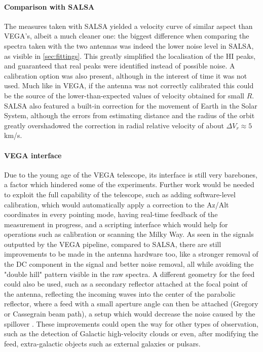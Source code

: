 \paragraph{Comparison with SALSA}
The measures taken with SALSA yielded a velocity curve of similar aspect than VEGA's, albeit a much cleaner one:
the biggest difference when comparing the spectra taken with the two antennas was indeed the lower noise level in SALSA, as visible in \autoref{sec:fittings}. 
This greatly simplified the localisation of the HI peaks, and guaranteed that real peaks were identified instead of possible noise.
A calibration option was also present, although in the interest of time it was not used. Much like in VEGA, if the antenna was not correctly calibrated this could be the source of the lower-than-expected values of velocity obtained for small $R$. 
SALSA also featured a built-in correction for the movement of Earth in the Solar System, although the errors from estimating distance and the radius of the orbit greatly overshadowed the correction in radial relative velocity of about $\Delta V_r \approx 5$ km/s.



\paragraph{VEGA interface}
Due to the young age of the VEGA telescope, its interface is still very barebones, a factor which hindered some of the experiments. Further work would be needed to exploit the full capability of the telescope, such as adding software-level calibration, which would automatically apply a correction to the Az/Alt coordinates in every pointing mode, having real-time feedback of the measurement in progress, and a scripting interface which would help for operations such as calibration or scanning the Milky Way. As seen in the signals outputted by the VEGA pipeline, compared to SALSA, there are still improvements to be made in the antenna hardware too, like a stronger removal of the DC component in the signal and better noise removal, all while avoiding the "double hill" pattern visible in the raw spectra. 
A different geometry for the feed could also be used, such as a secondary reflector attached at the focal point of the antenna, reflecting the incoming waves into the center of the parabolic reflector, where a feed with a small aperture angle can then be attached (Gregory or Cassegrain
beam path), a setup which would decrease the noise caused by the spillover \cite{lauterbach_radio_2022}.
These improvements could open the way for other types of observation, such as the detection of Galactic high-velocity clouds or even, after modifying the feed,  extra-galactic objects such as external galaxies or pulsars. 